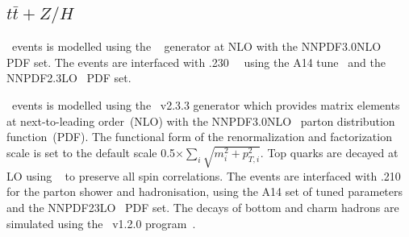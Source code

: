 \subsection{$t\bar{t}+Z/H$}

\par \ttH\ events is modelled using the \powhegbox~\cite{Frixione:2007nw,Nason:2004rx,Frixione:2007vw,Alioli:2010xd,Hartanto:2015uka}
generator at NLO with the NNPDF3.0NLO~\cite{Ball:2014uwa} PDF set.
The events are interfaced with \pythia.230~\cite{Sjostrand:2014zea}~ using the A14 tune~\cite{ATL-PHYS-PUB-2014-021} and the NNPDF2.3LO~\cite{Ball:2014uwa} PDF set.


\par \ttV\ events is modelled using the \mgamc~v2.3.3 \cite{Alwall:2014hca}
generator which provides matrix elements at next-to-leading order~(NLO) 
with the NNPDF3.0NLO~\cite{Ball:2014uwa} parton distribution function~(PDF).
The functional form of the renormalization and factorization scale is set to the default scale 0.5$\times \sum_i \sqrt{m^2_i+p^2_{T,i}}.$
Top quarks are decayed at LO using \madspin~\cite{Frixione:2007zp,Artoisenet:2012st} to preserve all spin correlations.
The events are interfaced with \pythia.210~\cite{Sjostrand:2014zea} for the parton shower and hadronisation,
using the A14 set of tuned parameters~\cite{ATL-PHYS-PUB-2014-021}  and the NNPDF23LO~\cite{Ball:2014uwa} PDF set.
The decays of bottom and charm hadrons are simulated using the \evtgen\ v1.2.0 program~\cite{EvtGen}.
